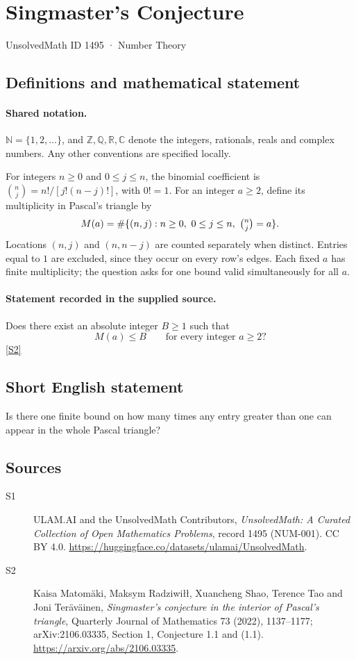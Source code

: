 \documentclass[11pt]{article}
\newcommand{\sref}[2]{\hyperlink{source:#1:#2}{[S#2]}}
\begin{document}
\setcounter{section}{1494}
\section{Singmaster's Conjecture}\label{1495}
{\small\sffamily UnsolvedMath ID 1495 · Number Theory}
\subsection{Definitions and mathematical statement}

\paragraph{Shared notation.}$\mathbb N=\{1,2,\ldots\}$, and $\mathbb Z,\mathbb Q,\mathbb R,\mathbb C$ denote the integers, rationals, reals and complex numbers. Any other conventions are specified locally.


For integers \(n\ge0\) and \(0\le j\le n\), the binomial
coefficient is \(\binom nj=n!/[j!(n-j)!]\), with \(0!=1\).
For an integer \(a\ge2\), define its multiplicity in Pascal's triangle by
\[
 M(a)=\#\{(n,j):n\ge0,\ 0\le j\le n,\ \tbinom nj=a\}.
\]
Locations \((n,j)\) and \((n,n-j)\) are counted separately when distinct.
Entries equal to \(1\) are excluded, since they occur on every row's edges.
Each fixed \(a\) has finite multiplicity; the question asks for one
bound valid simultaneously for all \(a\).
\paragraph{Statement recorded in the supplied source.}
Does there exist an absolute integer \(B\ge1\) such that
\[
                     M(a)\le B\qquad\text{for every integer }a\ge2?
\] \sref{1495}{2}
\subsection{Short English statement}
Is there one finite bound on how many times any entry greater than one can appear in the whole Pascal triangle?
\subsection{Sources}
\begin{description}
\item[\hypertarget{source:1495:1}{S1}] ULAM.AI and the UnsolvedMath Contributors, \emph{UnsolvedMath: A Curated Collection of Open Mathematics Problems}, record 1495 (NUM-001). CC BY 4.0. \url{https://huggingface.co/datasets/ulamai/UnsolvedMath}.
\item[\hypertarget{source:1495:2}{S2}] Kaisa Matom\"aki, Maksym Radziwi\l\l, Xuancheng Shao, Terence Tao and Joni Ter\"av\"ainen, \emph{Singmaster's conjecture in the interior of Pascal's triangle}, Quarterly Journal of Mathematics 73 (2022), 1137--1177; arXiv:2106.03335, Section 1, Conjecture 1.1 and (1.1). \url{https://arxiv.org/abs/2106.03335}.
\end{description}
\label{end:1495}
\end{document}

